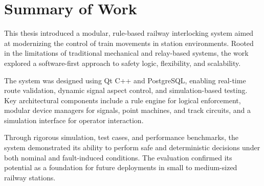 \section{Summary of Work}
\label{sec:conclusion:summary}

This thesis introduced a modular, rule-based railway interlocking system aimed at modernizing the control of train movements in station environments. Rooted in the limitations of traditional mechanical and relay-based systems, the work explored a software-first approach to safety logic, flexibility, and scalability.

The system was designed using Qt C++ and PostgreSQL, enabling real-time route validation, dynamic signal aspect control, and simulation-based testing. Key architectural components include a rule engine for logical enforcement, modular device managers for signals, point machines, and track circuits, and a simulation interface for operator interaction.

Through rigorous simulation, test cases, and performance benchmarks, the system demonstrated its ability to perform safe and deterministic decisions under both nominal and fault-induced conditions. The evaluation confirmed its potential as a foundation for future deployments in small to medium-sized railway stations.
